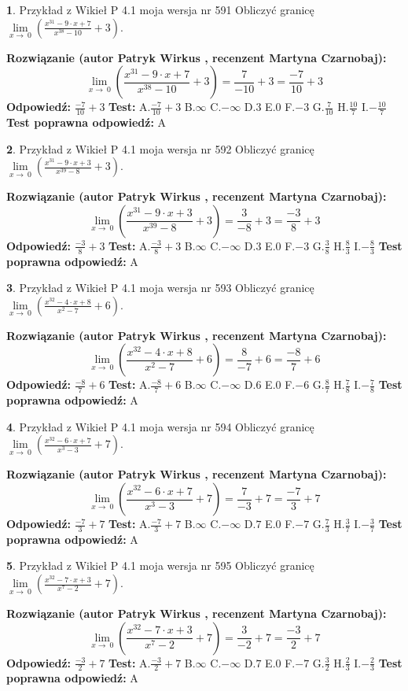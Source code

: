 \documentclass[12pt, a4paper]{article}
\theoremstyle{definition} %
\newtheorem{zad}{}
\newcommand{\zadStart}[1]{\begin{zad}#1\newline}
\newcommand{\zadStop}{\end{zad}}
\newcommand{\rozwStart}[2]{\noindent \textbf{Rozwiązanie (autor #1 , recenzent #2): }\newline}
\newcommand{\rozwStop}{\newline}
\newcommand{\odpStart}{\noindent \textbf{Odpowiedź:}\newline}
\newcommand{\odpStop}{\newline}
\newcommand{\testStart}{\noindent \textbf{Test:}\newline}
\newcommand{\testStop}{\newline}
\newcommand{\kluczStart}{\noindent \textbf{Test poprawna odpowiedź:}\newline}
\newcommand{\kluczStop}{\newline}
\begin{document}
\zadStart{Przykład z Wikieł P 4.1 moja wersja nr 591}
Obliczyć granicę $\lim\limits_{x\to\ 0}(\frac{x^{31}-9 \cdot x +7}{x^{38}-10}+3)$.
\zadStop
\rozwStart{Patryk Wirkus}{Martyna Czarnobaj}
$$\lim\limits_{x\to\ 0}(\frac{x^{31}-9 \cdot x +7}{x^{38}-10}+3)=\frac{7}{-10}+3=\frac{-7}{10}+3$$
\rozwStop
\odpStart
$\frac{-7}{10}+3$
\odpStop
\testStart
A.$\frac{-7}{10}+3$
B.$\infty$
C.$-\infty$
D.$3$
E.$0$
F.$-3$
G.$\frac{7}{10}$
H.$\frac{10}{7}$
I.$-\frac{10}{7}$
\testStop
\kluczStart
A
\kluczStop



\zadStart{Przykład z Wikieł P 4.1 moja wersja nr 592}
Obliczyć granicę $\lim\limits_{x\to\ 0}(\frac{x^{31}-9 \cdot x +3}{x^{39}-8}+3)$.
\zadStop
\rozwStart{Patryk Wirkus}{Martyna Czarnobaj}
$$\lim\limits_{x\to\ 0}(\frac{x^{31}-9 \cdot x +3}{x^{39}-8}+3)=\frac{3}{-8}+3=\frac{-3}{8}+3$$
\rozwStop
\odpStart
$\frac{-3}{8}+3$
\odpStop
\testStart
A.$\frac{-3}{8}+3$
B.$\infty$
C.$-\infty$
D.$3$
E.$0$
F.$-3$
G.$\frac{3}{8}$
H.$\frac{8}{3}$
I.$-\frac{8}{3}$
\testStop
\kluczStart
A
\kluczStop



\zadStart{Przykład z Wikieł P 4.1 moja wersja nr 593}
Obliczyć granicę $\lim\limits_{x\to\ 0}(\frac{x^{32}-4 \cdot x +8}{x^{2}-7}+6)$.
\zadStop
\rozwStart{Patryk Wirkus}{Martyna Czarnobaj}
$$\lim\limits_{x\to\ 0}(\frac{x^{32}-4 \cdot x +8}{x^{2}-7}+6)=\frac{8}{-7}+6=\frac{-8}{7}+6$$
\rozwStop
\odpStart
$\frac{-8}{7}+6$
\odpStop
\testStart
A.$\frac{-8}{7}+6$
B.$\infty$
C.$-\infty$
D.$6$
E.$0$
F.$-6$
G.$\frac{8}{7}$
H.$\frac{7}{8}$
I.$-\frac{7}{8}$
\testStop
\kluczStart
A
\kluczStop



\zadStart{Przykład z Wikieł P 4.1 moja wersja nr 594}
Obliczyć granicę $\lim\limits_{x\to\ 0}(\frac{x^{32}-6 \cdot x +7}{x^{3}-3}+7)$.
\zadStop
\rozwStart{Patryk Wirkus}{Martyna Czarnobaj}
$$\lim\limits_{x\to\ 0}(\frac{x^{32}-6 \cdot x +7}{x^{3}-3}+7)=\frac{7}{-3}+7=\frac{-7}{3}+7$$
\rozwStop
\odpStart
$\frac{-7}{3}+7$
\odpStop
\testStart
A.$\frac{-7}{3}+7$
B.$\infty$
C.$-\infty$
D.$7$
E.$0$
F.$-7$
G.$\frac{7}{3}$
H.$\frac{3}{7}$
I.$-\frac{3}{7}$
\testStop
\kluczStart
A
\kluczStop



\zadStart{Przykład z Wikieł P 4.1 moja wersja nr 595}
Obliczyć granicę $\lim\limits_{x\to\ 0}(\frac{x^{32}-7 \cdot x +3}{x^{7}-2}+7)$.
\zadStop
\rozwStart{Patryk Wirkus}{Martyna Czarnobaj}
$$\lim\limits_{x\to\ 0}(\frac{x^{32}-7 \cdot x +3}{x^{7}-2}+7)=\frac{3}{-2}+7=\frac{-3}{2}+7$$
\rozwStop
\odpStart
$\frac{-3}{2}+7$
\odpStop
\testStart
A.$\frac{-3}{2}+7$
B.$\infty$
C.$-\infty$
D.$7$
E.$0$
F.$-7$
G.$\frac{3}{2}$
H.$\frac{2}{3}$
I.$-\frac{2}{3}$
\testStop
\kluczStart
A
\kluczStop
\end{document}
